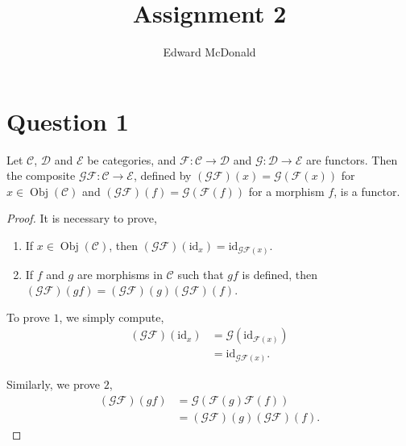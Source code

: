 \documentclass{unswmaths}
\begin{document}
\subject{Algebraic Topology}
\author{Edward McDonald}
\title{Assignment 2}

\newcommand{\Hilb}{\mathcal{H}}
\newcommand{\Proj}{\mathbf{P}}
\newcommand{\M}{\mathcal{M}}
\newcommand{\Dom}{\operatorname{Dom}}
\newcommand{\sgn}{\operatorname{sgn}}
\newcommand{\Ha}{\mathcal{H}}
\newcommand{\Span}{\operatorname{span}}
\newcommand{\im}{\operatorname{im}}
\newcommand{\C}{\mathcal{C}}
\newcommand{\D}{\mathcal{D}}
\newcommand{\E}{\mathcal{E}}
\newcommand{\F}{\mathcal{F}}
\newcommand{\G}{\mathcal{G}}
\newcommand{\id}{\mathrm{id}}
\setlength\parindent{0pt}

\unswtitle{}

\section*{Question 1}
\begin{proposition}
    Let $\C$, $\D$ and $\E$ be categories, and $\F:\C\to\D$
    and $\G:\D\to\E$ are functors. Then the composite 
    $\G\F:\C\rightarrow \E$, defined by $(\G\F)(x) = \G(\F(x))$
    for $x \in \operatorname{Obj}(\C)$
    and $(\G\F)(f) = \G(\F(f))$ for a morphism $f$, is a functor.
\end{proposition}
\begin{proof}
    It is necessary to prove,
    \begin{enumerate}
        \item{} If $x \in \operatorname{Obj}(\C)$, then $(\G\F)(\id_{x}) = \id_{\G\F(x)}$.
        \item{} If $f$ and $g$ are morphisms in $\C$ such that $gf$ is defined,
        then $(\G\F)(gf) = (\G\F)(g)(\G\F)(f)$.
    \end{enumerate}
    To prove $1$, we simply compute,
    \begin{align*}
        (\G\F)(\id_x) &= \G(\id_{\F(x)})\\
                      &= \id_{\G\F(x)}.
    \end{align*}
    
    Similarly, we prove $2$, 
    \begin{align*}
        (\G\F)(gf) &= \G(\F(g)\F(f))\\
                   &= (\G\F)(g)(\G\F)(f).
    \end{align*}
\end{proof}
\end{document}
